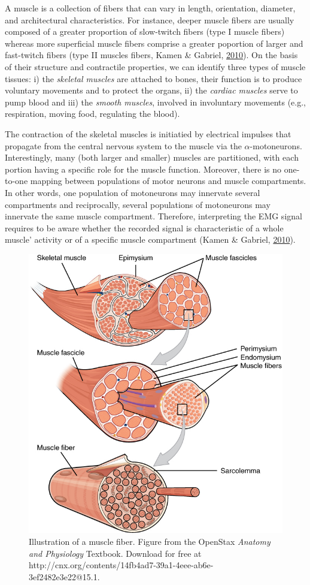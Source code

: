 \documentclass[a4paper,12pt,twoside,openright,oldfontcommands]{memoir}
\begin{document}
A muscle is a collection of fibers that can vary in length, orientation,
diameter, and architectural characteristics. For instance, deeper muscle
fibers are usually composed of a greater proportion of slow-twitch
fibers (type I muscle fibers) whereas more superficial muscle fibers
comprise a greater poportion of larger and fast-twitch fibers (type II
muscles fibers, Kamen \& Gabriel,
\protect\hyperlink{ref-kamen_essentials_2010}{2010}). On the basis of
their structure and contractile properties, we can identify three types
of muscle tissues: i) the \emph{skeletal muscles} are attached to bones,
their function is to produce voluntary movements and to protect the
organs, ii) the \emph{cardiac muscles} serve to pump blood and iii) the
\emph{smooth muscles}, involved in involuntary movements (e.g.,
respiration, moving food, regulating the blood).

The contraction of the skeletal muscles is initiatied by electrical
impulses that propagate from the central nervous system to the muscle
via the \(\alpha\)-motoneurons. Interestingly, many (both larger and
smaller) muscles are partitioned, with each portion having a specific
role for the muscle function. Moreover, there is no one-to-one mapping
between populations of motor neurons and muscle compartments. In other
words, one population of motoneurons may innervate several compartments
and reciprocally, several populations of motoneurons may innervate the
same muscle compartment. Therefore, interpreting the EMG signal requires
to be aware whether the recorded signal is characteristic of a whole
muscle' activity or of a specific muscle compartment (Kamen \& Gabriel,
\protect\hyperlink{ref-kamen_essentials_2010}{2010}).

\begin{figure}[H]

{\centering \includegraphics[width=0.5\linewidth]{assets/muscle} 

}

\caption{Illustration of a muscle fiber. Figure from the OpenStax \textit{Anatomy and Physiology} Textbook. Download for free at http://cnx.org/contents/14fb4ad7-39a1-4eee-ab6e-3ef2482e3e22@15.1.}\label{fig:muscle}
\end{figure}
\end{document}
